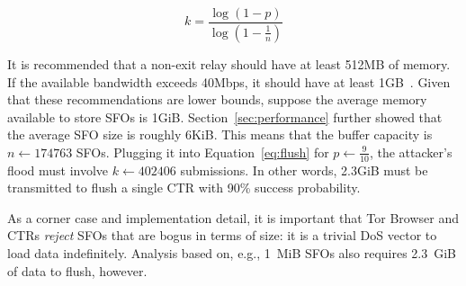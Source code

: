 \begin{equation} \label{eq:flush}
	k = \frac{\log(1-p)}{\log(1 - \frac{1}{n})}
\end{equation}

It is recommended that a non-exit relay should have at least 512MB of memory.
If the available bandwidth exceeds 40Mbps, it should have at least
1GB~\cite{relay-config}.  Given that these recommendations are lower bounds,
suppose the average memory available to store SFOs is 1GiB.
Section~\ref{sec:performance} further showed that the average SFO size is
roughly 6KiB.  This means that the buffer capacity is $n \gets 174763$ SFOs.
Plugging it into Equation~\ref{eq:flush} for $p \gets \frac{9}{10}$, the
attacker's flood must involve $k \gets 402406$ submissions.  In other words,
2.3GiB must be transmitted to flush a single CTR with 90\% success probability.

As a corner case and implementation detail, it is important that Tor Browser and
CTRs \emph{reject} SFOs that are bogus in terms of size: it is a trivial DoS
vector to load data indefinitely. Analysis based on, e.g., 1~MiB SFOs also
requires 2.3~GiB of data to flush, however.
